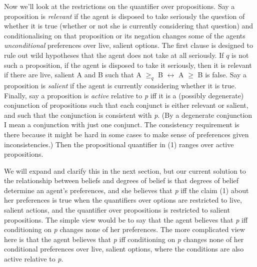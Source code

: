 \documentclass[
  11pt,
  letterpaper,
  DIV=11,
  numbers=noendperiod,
  oneside]{scrartcl}
\begin{document}
Now we'll look at the restrictions on the quantifier over propositions.
Say a proposition is \emph{relevant} if the agent is disposed to take
seriously the question of whether it is true (whether or not she is
currently considering that question) and conditionalising on that
proposition or its negation changes some of the agents
\emph{unconditional} preferences over live, salient options. The first clause is designed to rule out wild
hypotheses that the agent does not take at all seriously. If \(q\) is
not such a proposition, if the agent is disposed to take it seriously,
then it is relevant if there are live, salient A and B such that A
\(\geq _q\) B \(\leftrightarrow\) A \(\geq\) B is false. Say a
proposition is \emph{salient} if the agent is currently considering
whether it is true. Finally, say a proposition is \emph{active} relative
to \emph{p} iff it is a (possibly degenerate) conjunction of
propositions such that each conjunct is either relevant or salient, and
such that the conjunction is consistent with \emph{p}. (By a degenerate
conjunction I mean a conjunction with just one conjunct. The consistency
requirement is there because it might be hard in some cases to make
sense of preferences given inconsistencies.) Then the propositional
quantifier in (1) ranges over active propositions.

We will expand and clarify this in the next section, but our current
solution to the relationship between beliefs and degrees of belief is
that degrees of belief determine an agent's preferences, and she
believes that \emph{p} iff the claim (1) about her preferences is true
when the quantifiers over options are restricted to live, salient
actions, and the quantifier over propositions is restricted to salient
propositions. The simple view would be to say that the agent believes
that \emph{p} iff conditioning on \emph{p} changes none of her
preferences. The more complicated view here is that the agent believes
that \emph{p} iff conditioning on \emph{p} changes none of her
conditional preferences over live, salient options, where the conditions
are also active relative to \emph{p}.
\end{document}

